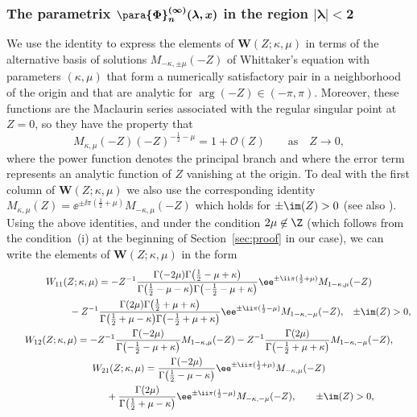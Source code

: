 \subsubsection[The parametrix Phi\^(infty)\_n(lambda,x) in the region lambda less than 2 in absolute value]{The parametrix $\boldsymbol{\para{\boldsymbol{\Phi}}^{(\infty)}_n(\lambda,x)}$ in the region $\boldsymbol{|\lambda|<2}$}

We use the identity \cite[equation~(13.14.33)]{DLMF} to express the elements of $\mathbf{W}(Z;\kappa,\mu)$ in terms of the alternative basis of solutions $M_{-\kappa,\pm\mu}(-Z)$ of Whittaker's equation with parameters $(\kappa,\mu)$ that form a numerically satisfactory pair in a neighborhood of the origin and that are analytic for $\arg(-Z)\in (-\pi,\pi)$. Moreover, these functions are the Maclaurin series associated with the regular singular point at $Z=0$, so they have the property that
\begin{equation}
M_{\kappa,\mu}(-Z)(-Z)^{-\frac{1}{2}-\mu} = 1+\mathcal{O}(Z) \qquad \text{as} \quad Z\to 0,
\label{eq:WhittakerM-near-origin}
\end{equation}
where the power function denotes the principal branch and where the error term represents an analytic function of $Z$ vanishing at the origin. To deal with the first column of $\mathbf{W}(Z;\kappa,\mu)$ we also use the corresponding identity $M_{\kappa,\mu}(Z)=\ee^{\pm \ii\pi(\frac{1}{2}+\mu)}M_{-\kappa,\mu}(-Z)$ which holds for $\pm\im(Z)>0$ (see also \cite[equation~(13.14.10)]{DLMF}).
Using the above identities, and under the condition $2\mu \not \in \Z$ (which follows from the condition~(i) at the beginning of Section~\ref{sec:proof} in our case), we can write the elements of $\mathbf{W}(Z;\kappa,\mu)$ in the form
\begin{gather*}\nonumber
 W_{11}(Z;\kappa,\mu)= -Z^{-1}\frac{\Gamma(-2\mu)\Gamma\big(\frac{1}{2}-\mu+\kappa\big)}{\Gamma\big(\frac{1}{2}-\mu-\kappa\big)\Gamma\bigl(-\frac{1}{2}-\mu+\kappa\bigr)}\ee^{\pm \ii\pi(\frac{1}{2}+\mu)}M_{1-\kappa,\mu}(-Z)\\
\hphantom{W_{11}(Z;\kappa,\mu)=}{}
-Z^{-1}\frac{\Gamma(2\mu)\Gamma\big(\frac{1}{2}+\mu+\kappa\big)}{\Gamma\big(\frac{1}{2}+\mu-\kappa\big)\Gamma\bigl(-\frac{1}{2}+\mu+\kappa\bigr)}
\ee^{\pm \ii\pi(\frac{1}{2}-\mu)}M_{1-\kappa,-\mu}(-Z),\quad\! \pm\im(Z)>0,\\
 W_{12}(Z;\kappa,\mu)= -Z^{-1}\frac{\Gamma(-2\mu)}{\Gamma\bigl(-\frac{1}{2}-\mu+\kappa\bigr)}M_{1-\kappa,\mu}(-Z)-Z^{-1}\frac{\Gamma(2\mu)}{\Gamma\bigl({-}\frac{1}{2}+\mu+\kappa\bigr)}M_{1-\kappa,-\mu}(-Z),\\
 W_{21}(Z;\kappa,\mu)= \frac{\Gamma(-2\mu)}{\Gamma\big(\frac{1}{2}-\mu-\kappa\big)}\ee^{\pm \ii\pi (\frac{1}{2}+\mu)}M_{-\kappa,\mu}(-Z)\\
 \hphantom{W_{21}(Z;\kappa,\mu)= }{}
 +
 \frac{\Gamma(2\mu)}{\Gamma\big(\frac{1}{2}+\mu-\kappa\big)}\ee^{\pm \ii\pi(\frac{1}{2}-\mu)}M_{-\kappa,-\mu}(-Z),\qquad\pm\im(Z)>0,
\end{gather*}%
